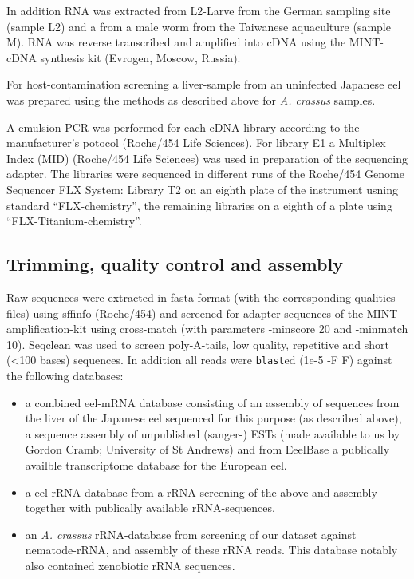 \documentclass[10pt]{bmc_article}
\newenvironment{bmcformat}{\begin{raggedright}\baselineskip20pt\sloppy\setboolean{publ}{false}}{\end{raggedright}\baselineskip20pt\sloppy}
\begin{document}
\begin{bmcformat}
In addition RNA was extracted from L2-Larve from the German sampling
site (sample L2) and a from a male worm from the Taiwanese aquaculture
(sample M). RNA was reverse transcribed and amplified into cDNA using
the MINT-cDNA synthesis kit (Evrogen, Moscow, Russia).

For host-contamination screening a liver-sample from an uninfected
Japanese eel was prepared using the methods as described above for
\textit{A. crassus} samples.

A emulsion PCR was performed for each cDNA library according to the
manufacturer's potocol (Roche/454 Life Sciences). For library E1 a
Multiplex Index (MID) (Roche/454 Life Sciences) was used in
preparation of the sequencing adapter. The libraries were sequenced in
different runs of the Roche/454 Genome Sequencer FLX System: Library
T2 on an eighth plate of the instrument usning standard
``FLX-chemistry'', the remaining libraries on a eighth of a plate
using ``FLX-Titanium-chemistry''.

\subsection*{Trimming, quality control and assembly}

Raw sequences were extracted in fasta format (with the corresponding
qualities files) using sffinfo (Roche/454) and screened for adapter
sequences of the MINT-amplification-kit using cross-match \cite{PHRAP}
(with parameters -minscore 20 and -minmatch 10). Seqclean
\cite{tgicl_pertea} was used to screen poly-A-tails, low quality,
repetitive and short (<100 bases) sequences. In addition all reads
were \texttt{blast}ed (1e-5 -F F) against the following databases:

\begin{itemize}
\item a combined eel-mRNA database consisting of an assembly of
  sequences from the liver of the Japanese eel sequenced for this
  purpose (as described above), a sequence assembly of unpublished
  (sanger-) ESTs (made available to us by Gordon Cramb; University of
  St Andrews) and from EeelBase \cite{pmid21080939} a publically
  availble transcriptome database for the European eel.
\item a eel-rRNA database from a rRNA screening of the above and
  assembly together with publically available rRNA-sequences.
\item an \textit{A. crassus} rRNA-database from screening of our
  dataset against nematode-rRNA, and assembly of these rRNA
  reads. This database notably also contained xenobiotic rRNA
  sequences.
\end{itemize}


\end{bmcformat}
\end{document}
